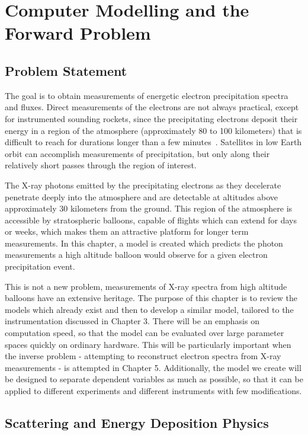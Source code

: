 \chapter{Computer Modelling and the Forward Problem}

\section{Problem Statement}

The goal is to obtain measurements of energetic electron precipitation spectra and fluxes. Direct measurements of the electrons are not always practical, except for instrumented sounding rockets, since the  precipitating electrons deposit their energy in a region of the atmosphere (approximately 80 to 100 kilometers) that is difficult to reach for durations longer than a few minutes~\citep{Berger1972}. Satellites in low Earth orbit can accomplish measurements of precipitation, but only along their relatively short passes through the region of interest. 

The X-ray photons emitted by the precipitating electrons as they decelerate penetrate deeply into the atmosphere and are detectable at altitudes above approximately 30 kilometers from the ground. This region of the atmosphere is accessible by stratospheric balloons, capable of flights which can extend for days or weeks, which makes them an attractive platform for longer term measurements. In this chapter, a model is created which predicts the photon measurements a high altitude balloon would observe for a given electron precipitation event. 

This is not a new problem, measurements of X-ray spectra from high altitude balloons have an extensive heritage. The purpose of this chapter is to review the models which already exist and then to develop a similar model, tailored to the instrumentation discussed in Chapter 3. There will be an emphasis on computation speed, so that the model can be evaluated over large parameter spaces quickly on ordinary hardware. This will be particularly important when the inverse problem - attempting to reconstruct electron spectra from X-ray measurements - is attempted in Chapter 5. Additionally, the model we create will be designed to separate dependent variables as much as possible, so that it can be applied to different experiments and different instruments with few modifications. 

\section{Scattering and Energy Deposition Physics}

